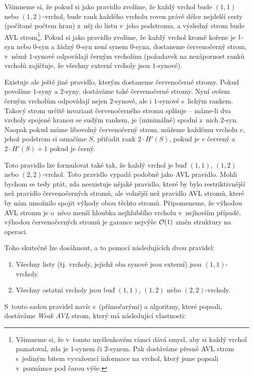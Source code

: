 Všimneme si, že pokud si jako pravidlo zvolíme, že každý vrchol bude $(1,1)$
nebo $(1,2)$-vrchol, bude rank každého vrcholu roven právě délce nejdelší cesty
(počítané počtem hran) z~něj do listu v~jeho podstromu, a výsledný strom bude
AVL strom\footnote{Všimneme si, že v~tomto myšlenkovém rámci dává smysl, aby si každý vrchol pamatoval, zda je $1$-synem či $2$-synem. Pak dostáváme přesně AVL strom s~jediným bitem vyvažovací informace na vrchol, který jsme popsali v~poznámce pod čarou výše.}. Pokud si jako pravidlo zvolíme, že každý vrchol kromě kořene je
$1$-syn nebo $0$-syn a žádný $0$-syn není synem $0$-syna, dostaneme
červenočerný strom, v~němž $1$-synové odpovídají černým vrcholům (požadavek na
nezápornost ranků vrcholů zajišťuje, že všechny externí vrcholy jsou
$1$-synové).

Existuje ale ještě jiné pravidlo, kterým dostaneme červenočerné stromy. Pokud
povolíme $1$-syny a $2$-syny, dostáváme také červenočerné stromy. Nyní ovšem
černým vrcholům odpovídají nejen $2$-synové, ale i $1$-synové s~lichým rankem.
Takový strom určitě invariant červenočerného stromu splňuje -- máme-li dva
vrcholy spojené hranou se sudým rankem, je (minimálně) spodní z~nich 2-syn.
Naopak pokud máme libovolný červenočerný strom, můžeme každému vrcholu $v$, jehož
podstrom si označíme $S$, přiřadit rank $2\cdot H'(S)$, pokud je $v$ červený a
$2\cdot H'(S) + 1$ pokud je černý.

Toto pravidlo lze formulovat také tak, že každý vrchol je buď $(1,1)$, $(1,2)$ nebo $(2,2)$-vrchol. Toto pravidlo vypadá podobně jako AVL pravidlo. Mohli bychom se tedy ptát, zda neexistuje nějaké pravidlo, které by bylo restriktivnější než pravidlo červenočerných stromů, ale volnější než pravidlo AVL stromů, které by nám umožnilo spojit výhody obou těchto stromů. Připomeneme, že výhodou AVL stromu je o~něco menší hloubka nejhlubšího vrcholu v~nejhorším případě, výhodou červenočerných stromů je garance nejvýše $\mathcal O(1)$ změn struktury na operaci. 

Toho skutečně lze dosáhnout, a to pomocí následujících dvou pravidel:
\begin{enumerate}
\item Všechny listy (tj. vrcholy, jejichž oba synové jsou externí) jsou $(1,1)$-vrcholy.
\item Všechny ostatní vrcholy jsou buď $(1,1)$, $(1,2)$ nebo $(2,2)$-vrcholy.
\end{enumerate}

S~touto sadou pravidel navíc s~(přímočarými)  a  algoritmy, které \citet{rankbalanced} popsali, dostáváme \emph{Weak AVL} strom, který má následující vlastnosti:

